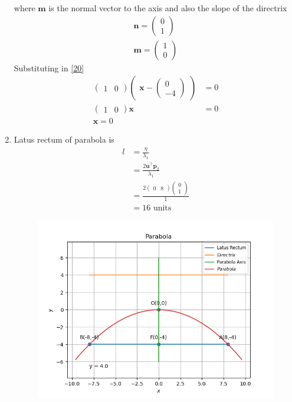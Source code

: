 \documentclass[12pt]{article}
\newcommand{\myvec}[1]{\ensuremath{\begin{pmatrix}#1\end{pmatrix}}}
\let\vec\mathbf
\begin{document}
\begin{enumerate}
where $\vec{m}$ is the normal vector to the axis and also the slope of the directrix
\begin{align}
	\vec{n} = \myvec{0\\1}\\
	\vec{m} = \myvec{1\\0}
\end{align}
Substituting in \eqref{20}
\begin{align}
	\myvec{1&0}\myvec{\vec{x}-\myvec{0\\-4}}&=0\\
	\myvec{1&0}\vec{x} &= 0\\
	\vec{x}=0
\end{align}
\item Latus rectum of  parabola is 
\begin{align}
	l&=\frac{\eta}{\lambda_1}\\
	 &=\frac{2\vec{u}^\top \vec{p}_2}{\lambda_1}\\
	 &=\frac{2\myvec{0&8}\myvec{0\\1}}{1}\\
	 &=16 \text{ units }
\end{align}
\begin{figure}[!h]
	\begin{center} 
	    \includegraphics[width=\columnwidth]{chapters/11/11/2/4/figs/parabola}
	\end{center}
\caption{}
\label{fig:chapters/11/11/2/4/Fig1}
\end{figure}
\end{enumerate}
\end{document}
